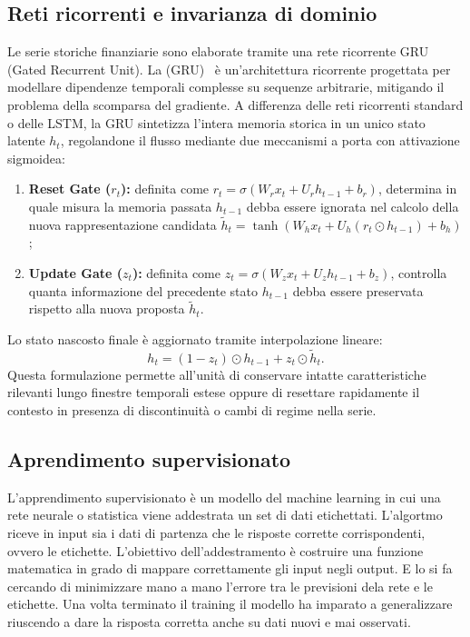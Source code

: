 \subsection{Reti ricorrenti e invarianza di dominio}
Le serie storiche finanziarie sono elaborate tramite una rete ricorrente GRU (Gated Recurrent Unit).
La (GRU)~\cite{cho2014gru} è un'architettura ricorrente progettata per modellare dipendenze temporali complesse su sequenze arbitrarie, mitigando il problema della scomparsa del gradiente. A differenza delle reti ricorrenti standard o delle LSTM, la GRU sintetizza l'intera memoria storica in un unico stato latente $h_t$, regolandone il flusso mediante due meccanismi a porta con attivazione sigmoidea:
\begin{enumerate}
    \item \textbf{Reset Gate ($r_t$):} definita come $r_t = \sigma(W_r x_t + U_r h_{t-1} + b_r)$, determina in quale misura la memoria passata $h_{t-1}$ debba essere ignorata nel calcolo della nuova rappresentazione candidata $\tilde{h}_t = \tanh(W_h x_t + U_h (r_t \odot h_{t-1}) + b_h)$;
    \item \textbf{Update Gate ($z_t$):} definita come $z_t = \sigma(W_z x_t + U_z h_{t-1} + b_z)$, controlla quanta informazione del precedente stato $h_{t-1}$ debba essere preservata rispetto alla nuova proposta $\tilde{h}_t$.
\end{enumerate}
Lo stato nascosto finale è aggiornato tramite interpolazione lineare:
\begin{equation}
h_t = (1 - z_t) \odot h_{t-1} + z_t \odot \tilde{h}_t.
\end{equation}
Questa formulazione permette all'unità di conservare intatte caratteristiche rilevanti lungo finestre temporali estese oppure di resettare rapidamente il contesto in presenza di discontinuità o cambi di regime nella serie.

\subsection{Aprendimento supervisionato}
L'apprendimento supervisionato è un modello del machine learning in cui una rete neurale o statistica viene addestrata un set di dati etichettati.
L'algortmo riceve in input sia i dati di partenza che le risposte corrette corrispondenti, ovvero le etichette.
L'obiettivo dell'addestramento è costruire una funzione matematica in grado di mappare correttamente gli input negli output. 
E lo si fa cercando di minimizzare mano a mano l'errore tra le previsioni dela rete e le etichette.
Una volta terminato il training il modello ha imparato a generalizzare riuscendo a dare la risposta corretta anche su dati nuovi e mai osservati.

